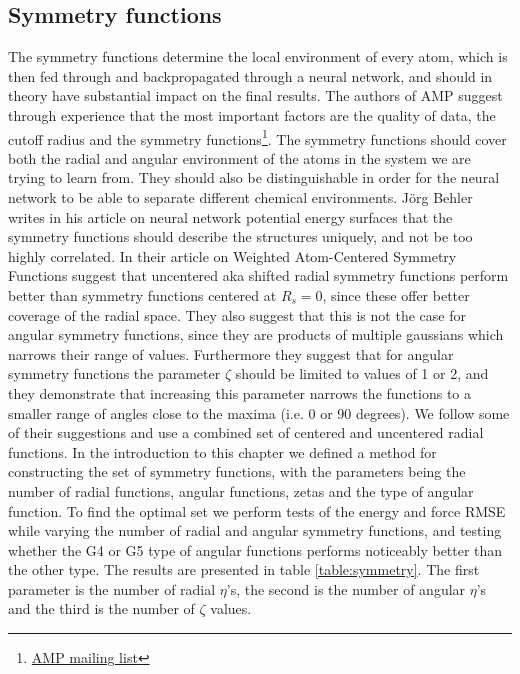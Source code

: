 \subsection{Symmetry functions}
The symmetry functions determine the local environment of every atom,
which is then fed through and backpropagated through a neural network,
and should in theory have substantial impact on the final results.
The authors of AMP suggest through experience that the most important
factors are the quality of data, the cutoff radius and the symmetry functions\footnote{
    \href{https://listserv.brown.edu/cgi-bin/wa?A2=AMP-USERS;52062bd3.1810}{
        AMP mailing list}}.
The symmetry functions should cover both the radial and angular
environment of the atoms in the system we are trying to learn from.
They should also be distinguishable in order for the neural network
to be able to separate different chemical environments.
J{\"o}rg Behler writes in his article on neural network potential
energy surfaces \parencite[Behler]{behler2011neural}
that the symmetry functions should describe the structures uniquely,
and not be too highly correlated.
In their article on Weighted Atom-Centered Symmetry Functions
\parencite[Gastegger et al.]{gastegger2018wacsf} suggest that uncentered
aka shifted radial symmetry functions perform better than symmetry functions
centered at $R_s = 0$, since these offer better coverage of the radial space.
They also suggest that this is not the case for angular symmetry functions,
since they are products of multiple gaussians which narrows their range
of values. 
Furthermore they suggest that for angular symmetry functions
the parameter $\zeta$ should be limited to values of 1 or 2,
and they demonstrate that increasing this parameter narrows
the functions to a smaller range of angles close to the maxima
(i.e. 0 or 90 degrees).
We follow some of their suggestions and use a combined set of
centered and uncentered radial functions. 
In the introduction to this chapter we defined a method
for constructing the set of symmetry functions, with the parameters
being the number of radial functions, angular functions, zetas
and the type of angular function.
To find the optimal set
we perform tests of the energy and force RMSE while varying the
number of radial and angular symmetry functions, and testing
whether the G4 or G5 type of angular functions performs noticeably
better than the other type.
The results are presented in table \ref{table:symmetry}.
The first parameter is the number of radial $\eta$'s,
the second is the number of angular $\eta$'s and the third
is the number of $\zeta$ values.

